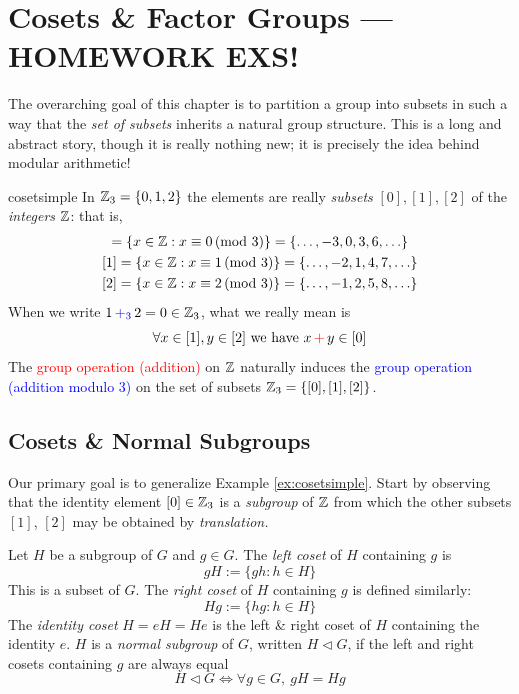 \graphicspath{{5coset/asy/}}
\setcounter{section}{4}

\section{Cosets \& Factor Groups --- HOMEWORK EXS!}\label{chap:coset}

The overarching goal of this chapter is to partition a group into subsets in such a way that the \emph{set of subsets} inherits a natural group structure. This is a long and abstract story, though it is really nothing new; it is precisely the idea behind modular arithmetic!

\begin{example}{}{cosetsimple}
	In $\mathbb{Z}_3=\{0,1,2\}$ the elements are really \emph{subsets} $[0],[1],[2]$ of the \emph{integers} $\mathbb{Z}$: that is,
	\begin{gather*}
		[0]=\{x\in\Z:x \equiv 0\negthickspace\pmod 3\} =\{\ldots,-3,0,3,6,\ldots\}\\
		[1]=\{x\in\Z:x \equiv 1\negthickspace\pmod 3\} =\{\ldots,-2,1,4,7,\ldots\}\\
		[2]=\{x\in\Z:x \equiv 2\negthickspace\pmod 3\} =\{\ldots,-1,2,5,8,\ldots\}
	\end{gather*}
	When we write $1\operatorname{\textcolor{blue}{+_3}}2=0\in\mathbb{Z}_3$, what we really mean is
	\[
		\forall x\in[1], y\in[2]
		\text{ we have }
		x\operatorname{\textcolor{red}{+}}y\in [0]
	\]
	The \textcolor{red}{group operation (addition)} on $\mathbb{Z}$ naturally induces the \textcolor{blue}{group operation (addition modulo 3)} on the set of subsets $\mathbb{Z}_3=\{[0],[1],[2]\}$. 
\end{example}


\subsection{Cosets \& Normal Subgroups}\label{sec:cosetnormal}

Our primary goal is to generalize Example \ref{ex:cosetsimple}. Start by observing that the identity element $[0]\in\mathbb{Z}_3$ is a \emph{subgroup} of $\mathbb{Z}$ from which the other subsets $[1]$, $[2]$ may be obtained by \emph{translation.}

\begin{defn}{}{}
	Let $H$ be a subgroup of $G$ and $g\in G$. The \emph{left coset} of $H$ containing $g$ is 
	\[
		gH:=\{gh:h\in H\}\tag{$x\in gH\iff \exists h\in H$ such that $x=gh$}
	\]
	This is a subset of $G$. The \emph{right coset} of $H$ containing $g$ is defined similarly:
	\[
		Hg:=\{hg:h\in H\}
	\]
	The \emph{identity coset} $H=eH=He$ is the left \& right coset of $H$ containing the identity $e$.\smallbreak
	$H$ is a \emph{normal subgroup} of $G$, written $H\triangleleft G$, if the left and right cosets containing $g$ are always equal
	\[
		H\triangleleft G
		\iff
		\forall g\in G,\ gH=Hg
	\]
\end{defn}

